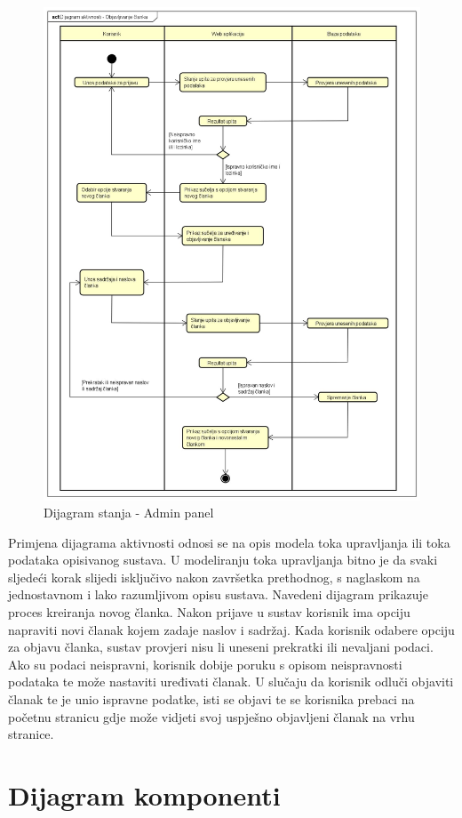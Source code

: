 \begin{figure}[H]
	\includegraphics[scale=0.4]{slike/dijagram-aktivnosti.jpeg}
	\centering
	\caption{Dijagram stanja - Admin panel}
	\label{fig:activity_diagram}
\end{figure}

Primjena dijagrama aktivnosti odnosi se na opis modela toka upravljanja ili 
toka podataka opisivanog sustava. U modeliranju toka upravljanja bitno je da 
svaki sljedeći korak slijedi isključivo nakon završetka prethodnog, s 
naglaskom na jednostavnom i lako razumljivom opisu sustava. Navedeni dijagram 
prikazuje proces kreiranja novog članka. Nakon prijave u sustav korisnik ima 
opciju napraviti novi članak kojem zadaje naslov i sadržaj. Kada korisnik 
odabere opciju za objavu članka, sustav provjeri nisu li uneseni prekratki ili 
nevaljani podaci. Ako su podaci neispravni, korisnik dobije poruku s opisom 
neispravnosti podataka te može nastaviti uređivati članak. U slučaju da 
korisnik odluči objaviti članak te je unio ispravne podatke, isti se objavi te 
se korisnika prebaci na početnu stranicu gdje može vidjeti svoj uspješno 
objavljeni članak na vrhu stranice.

\eject


\section{Dijagram komponenti}
